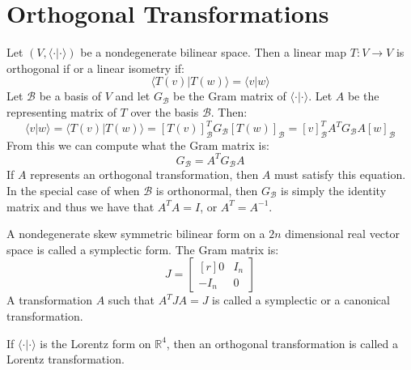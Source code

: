 \documentclass[crop=false,class=article]{standalone}                           %
\begin{document}
    \section{Orthogonal Transformations}
        Let $(V,\langle\cdot|\cdot\rangle)$ be a nondegenerate bilinear space.
        Then a linear map $T:V\rightarrow{V}$ is orthogonal if or a linear
        isometry if:
        \begin{equation}
            \langle{T}(v)|T(w)\rangle=\langle{v}|w\rangle
        \end{equation}
        Let $\mathscr{B}$ be a basis of $V$ and let $G_{\mathscr{B}}$ be the
        Gram matrix of $\langle\cdot|\cdot\rangle$. Let $A$ be the representing
        matrix of $T$ over the basis $\mathscr{B}$. Then:
        \begin{equation}
            \langle{v}|w\rangle
            =\langle{T}(v)|T(w)\rangle
            =[T(v)]_{\mathscr{B}}^{T}G_{\mathscr{B}}[T(w)]_{\mathscr{B}}
            =[v]_{\mathscr{B}}^{T}A^{T}G_{\mathscr{B}}A[w]_{\mathscr{B}}
        \end{equation}
        From this we can compute what the Gram matrix is:
        \begin{equation}
            G_{\mathscr{B}}=A^{T}G_{\mathscr{B}}A
        \end{equation}
        If $A$ represents an orthogonal transformation, then $A$ must satisfy
        this equation. In the special case of when $\mathscr{B}$ is orthonormal,
        then $G_{\mathscr{B}}$ is simply the identity matrix and thus we have
        that $A^{T}A=I$, or $A^{T}=A^{\minus{1}}$.
        \par\hfill\par
        A nondegenerate skew symmetric bilinear form on a $2n$ dimensional real
        vector space is called a symplectic form. The Gram matrix is:
        \begin{equation}
            J=
            \begin{bmatrix*}[r]
                0&I_{n}\\
                \minus{I}_{n}&0
            \end{bmatrix*}
        \end{equation}
        A transformation $A$ such that $A^{T}JA=J$ is called a symplectic or
        a canonical transformation.
        \par\hfill\par
        If $\langle\cdot|\cdot\rangle$ is the Lorentz form on $\mathbb{R}^{4}$,
        then an orthogonal transformation is called a Lorentz transformation.
\end{document}
